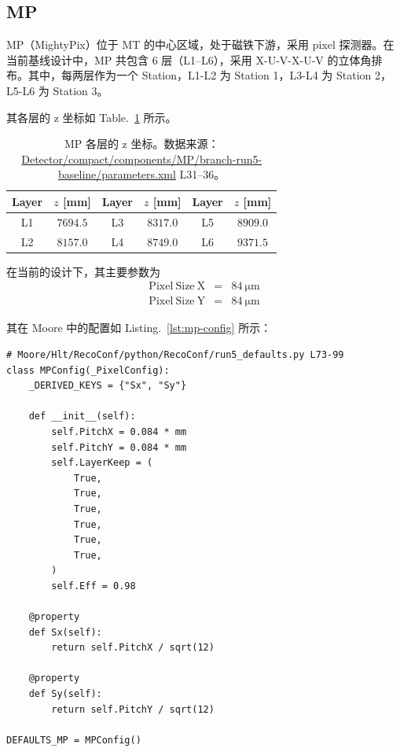 \documentclass[UTF8]{article}
\begin{document}
\subsection{MP}

MP（MightyPix）位于 MT 的中心区域，处于磁铁下游，采用 pixel 探测器。在当前基线设计中，MP 共包含 6 层（L1--L6），采用 X-U-V-X-U-V 的立体角排布。其中，每两层作为一个 Station，L1-L2 为 Station 1，L3-L4 为 Station 2，L5-L6 为 Station 3。

其各层的 z 坐标如 Table.~\ref{tab:mp-z} 所示。

\begin{table}[htbp]
  \centering
  \caption{MP 各层的 z 坐标。数据来源：\protect\url{Detector/compact/components/MP/branch-run5-baseline/parameters.xml} L31--36。}
  \label{tab:mp-z}
  \begin{tabular}{cc|cc|cc}
    \toprule
    Layer & $z$ [mm] & Layer & $z$ [mm] & Layer & $z$ [mm] \\
    \midrule
    L1 & $7694.5$ & L3 & $8317.0$ & L5 & $8909.0$ \\
    L2 & $8157.0$ & L4 & $8749.0$ & L6 & $9371.5$ \\
    \bottomrule
  \end{tabular}
\end{table}

在当前的设计下，其主要参数为
\begin{eqnarray}
\mathrm{Pixel~Size~X} &=& 84~\mathrm{\mu m}\\
\mathrm{Pixel~Size~Y} &=& 84~\mathrm{\mu m}
\end{eqnarray}

其在 Moore 中的配置如 Listing.~\ref{lst:mp-config} 所示：

\begin{lstlisting}[style=python, label=lst:mp-config, caption={MP 探测器配置代码（MPConfig）}]
# Moore/Hlt/RecoConf/python/RecoConf/run5_defaults.py L73-99
class MPConfig(_PixelConfig):
    _DERIVED_KEYS = {"Sx", "Sy"}

    def __init__(self):
        self.PitchX = 0.084 * mm
        self.PitchY = 0.084 * mm
        self.LayerKeep = (
            True,
            True,
            True,
            True,
            True,
            True,
        )
        self.Eff = 0.98

    @property
    def Sx(self):
        return self.PitchX / sqrt(12)

    @property
    def Sy(self):
        return self.PitchY / sqrt(12)

DEFAULTS_MP = MPConfig()
\end{lstlisting}
\end{document}
